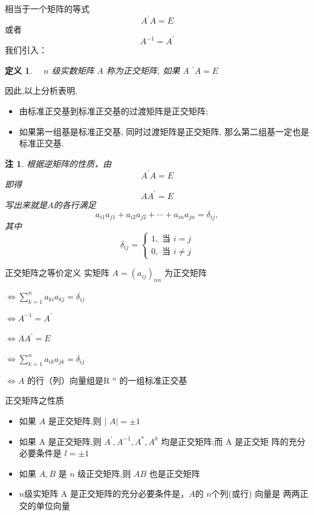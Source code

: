 \documentclass[13pt]{beamer}
\newtheorem*{defi}{定义}
\newtheorem*{rem}{注}
\def\pf{{\bf 证明~~ }}
\begin{document}
\begin{frame}
相当于一个矩阵的等式
\[
A^{\prime} A=E
\]
或者
\[
{A}^{-1}={A}^{\prime}
\]
我们引入： 
\begin{defi}
$\quad n$ 级实数矩阵 A 称为正交矩阵, 如果 A $^{\prime} {A}={E}$
\end{defi}
 因此,以上分析表明,
 \begin{itemize}
	\item 由标准正交基到标准正交基的过渡矩阵是正交矩阵;
 	\item 如果第一组基是标准正交基, 同时过渡矩阵是正交矩阵, 那么第二组基一定也是标准正交基.
 \end{itemize}

\end{frame}


\begin{frame}
\begin{rem}
根据逆矩阵的性质，由
\[
{A}^{\prime} {A}={E}
\]
即得
\[
A A^{\prime}=E
\]
写出来就是$A$的各\alert{行}满足
\[
a_{i 1} a_{j 1}+a_{i 2} a_{j 2}+\cdots+a_{i n} a_{j n}=\delta_{i j}, 
\]
其中 \[
\delta_{i j}=
\left\{\begin{array}{l}
1, \text { 当 } i=j \\
0, \text { 当 } i \neq j
\end{array}\right.
\]
\end{rem}

\end{frame}


\begin{frame}{正交矩阵之等价定义}
实矩阵 $A=\left(a_{i j}\right)_{n n}$ 为正交矩阵

 $\Leftrightarrow  \sum_{k=1}^{n} a_{k i} a_{k j}=\delta_{i j} $
 
 $\Leftrightarrow A^{-1}=A^{\prime}$
 
$\Leftrightarrow A A^{\prime}=E $

$\Leftrightarrow \sum_{k=1}^{n} a_{i k} a_{j k}=\delta_{i j}$

$\Leftrightarrow A$ 的行（列）向量组是R $^{n}$ 的一组标准正交基
\end{frame}


\begin{frame}{正交矩阵之性质}
\begin{itemize}
	\item 如果 $A$ 是正交矩阵,则 | $A |=\pm 1$
	\item 如果 A 是正交矩阵,则 $A^{\prime}, A^{-1}, A^{*}, A^{k}$ 均是正交矩阵;而 A 是正交矩
	阵的充分必要条件是 $l=\pm 1$
	\item 如果 $A, B$ 是 $n$ 级正交矩阵,则 $A B$ 也是正交矩阵
	\item $n$级实矩阵 A 是正交矩阵的充分必要条件是，$A$的 $n$个列(或行) 向量是 两两正交的单位向量
\end{itemize}

\end{frame}
\end{document}
